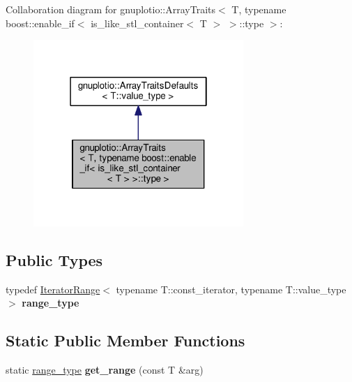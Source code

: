 Collaboration diagram for gnuplotio\+:\+:Array\+Traits$<$ T, typename boost\+:\+:enable\+\_\+if$<$ is\+\_\+like\+\_\+stl\+\_\+container$<$ T $>$ $>$\+:\+:type $>$\+:
\nopagebreak
\begin{figure}[H]
\begin{center}
\leavevmode
\includegraphics[width=226pt]{classgnuplotio_1_1_array_traits_3_01_t_00_01typename_01boost_1_1enable__if_3_01is__like__stl__coea0859b06c932ef4cd47658c6683d98b}
\end{center}
\end{figure}
\subsection*{Public Types}
\begin{DoxyCompactItemize}
\item 
typedef \hyperlink{classgnuplotio_1_1_iterator_range}{Iterator\+Range}$<$ typename T\+::const\+\_\+iterator, typename T\+::value\+\_\+type $>$ {\bfseries range\+\_\+type}\hypertarget{classgnuplotio_1_1_array_traits_3_01_t_00_01typename_01boost_1_1enable__if_3_01is__like__stl__co9e1736bbd08cd58c6993ab613a998887_ab702072abbe018bbc90b9967ca8c4b42}{}\label{classgnuplotio_1_1_array_traits_3_01_t_00_01typename_01boost_1_1enable__if_3_01is__like__stl__co9e1736bbd08cd58c6993ab613a998887_ab702072abbe018bbc90b9967ca8c4b42}

\end{DoxyCompactItemize}
\subsection*{Static Public Member Functions}
\begin{DoxyCompactItemize}
\item 
static \hyperlink{classgnuplotio_1_1_iterator_range}{range\+\_\+type} {\bfseries get\+\_\+range} (const T \&arg)\hypertarget{classgnuplotio_1_1_array_traits_3_01_t_00_01typename_01boost_1_1enable__if_3_01is__like__stl__co9e1736bbd08cd58c6993ab613a998887_a89d4150ab3c479cde972071a10acd27b}{}\label{classgnuplotio_1_1_array_traits_3_01_t_00_01typename_01boost_1_1enable__if_3_01is__like__stl__co9e1736bbd08cd58c6993ab613a998887_a89d4150ab3c479cde972071a10acd27b}

\end{DoxyCompactItemize}
